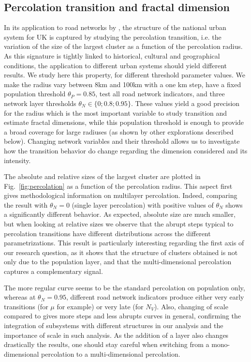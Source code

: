 \documentclass{jimis-en}
\begin{document}
\subsection{Percolation transition and fractal dimension}



In its application to road networks by \cite{arcaute2016cities}, the structure of the national urban system for UK is captured by studying the percolation transition, i.e. the variation of the size of the largest cluster as a function of the percolation radius. As this signature is tightly linked to historical, cultural and geographical conditions, the application to different urban systems should yield different results. We study here this property, for different threshold parameter values. We make the radius vary between 8km and 100km with a one km step, have a fixed population threshold $\theta_P = 0.85$, test all road network indicators, and three network layer thresholds $\theta_N \in \{ 0 ; 0.8 ; 0.95 \}$. These values yield a good precision for the radius which is the most important variable to study transition and estimate fractal dimensions, while this population threshold is enough to provide a broad coverage for large radiuses (as shown by other explorations described below). Changing network variables and their threshold allows us to investigate how the transition behavior do change regarding the dimension considered and its intensity.

The absolute and relative sizes of the largest cluster are plotted in Fig.~\ref{fig:percolation} as a function of the percolation radius. This aspect first gives methodological information on multilayer percolation. Indeed, comparing the result with $\theta_N = 0$ (single layer percolation) with positive values of $\theta_N$ shows a significantly different behavior. As expected, absolute size are much smaller, but when looking at relative sizes we observe that the abrupt steps typical to percolation transitions have different distributions across the different parametrizations. This result is particularly interesting regarding the first axis of our research question, as it shows that the structure of clusters obtained is not only due to the population layer, and that the multi-dimensional percolation captures a complementary signal.
 
The more regular curve seems to be the standard percolation on population only, whereas at $\theta_N = 0.95$, different road network indicators produce either very early transitions (for $\mu$ for example) or very late (for $N_V$). Also, changing of scale compared to \cite{arcaute2016cities} gives more steps and less abrupts curves in general, confirming the integration of subsystems with different structures in our analysis and the importance of scale in such analysis. As the addition of a layer also changes drastically the results, one should stay careful when switching from a mono-dimensional percolation to a multi-dimensional percolation.
\end{document}

